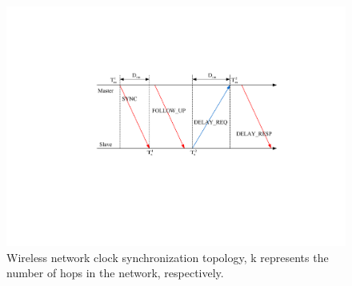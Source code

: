 \documentclass[conference]{IEEEtran}
\begin{document}
	\begin{figure}[htbp]
		
		\centerline{\includegraphics[scale=0.5]{fig2.eps}}
		\caption{Wireless network clock synchronization topology, k represents the number of hops in the network, respectively.}
		\label{fig2}
	\end{figure}
	
\end{document}
